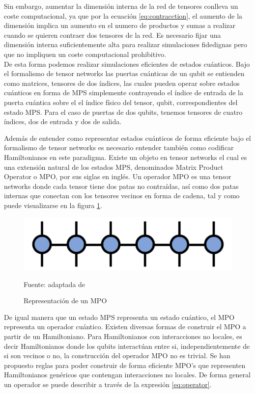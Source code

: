 Sin embargo, aumentar la dimensión interna de la red de tensores conlleva un coste computacional, ya que por la ecuación \ref{eq:contracction}, el aumento de la dimensión implica un aumento en el numero de productos y sumas a realizar cuando se quieren contraer dos tensores de la red. Es necesario fijar una dimensión interna suficientemente alta para realizar simulaciones fidedignas pero que no impliquen un coste computacional prohibitivo. \\

De esta forma podemos realizar simulaciones eficientes de estados cuánticos. Bajo el formalismo de tensor networks las puertas cuánticas de un qubit se entienden como matrices, tensores de dos índices, las cuales pueden operar sobre estados cuánticos en forma de MPS simplemente contrayendo el índice de entrada de la puerta cuántica sobre el el índice físico del tensor, qubit, correspondientes del estado MPS. Para el caso de puertas de dos qubits, tenemos tensores de cuatro índices, dos de entrada y dos de salida. \\

\newpage

Además de entender como representar estados cuánticos de forma eficiente bajo el formalismo de tensor networks es necesario entender también como codificar Hamiltonianos en este paradigma. Existe un objeto en tensor networks el cual es una extensión natural de los estados MPS, denominados Matrix Product Operator o MPO, por sus siglas en inglés. Un operador MPO es una tensor networks donde cada tensor tiene dos patas no contraídas, así como dos patas internas que conectan con los tensores vecinos en forma de cadena, tal y como puede visualizarse en la figura \ref{fig:mpo}.


\begin{figure}[!ht]
    \centering
    \includegraphics[scale = 0.35]{img/03-mpo.png}
    \caption{Representación de un MPO}
    Fuente: adaptada de \citep{tn} 
    \label{fig:mpo}
\end{figure}

De igual manera que un estado MPS representa un estado cuántico, el MPO representa un operador cuántico. Existen diversas formas de construir el MPO a partir de un Hamiltoniano. Para Hamiltonianos con interacciones no locales, es decir Hamiltonianos donde los qubits interactúan entre si, independientemente de si son vecinos o no, la construcción del operador MPO no es trivial. Se han propuesto reglas \citep{fröwis} para poder construir de forma eficiente MPO's que representen Hamiltonianos genéricos que contengan interacciones no locales. De forma general un operador se puede describir a través de la expresión \ref{eq:operator}.

